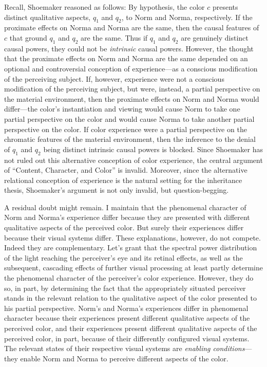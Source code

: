 \documentclass[12pt]{article}
\begin{document}
Recall, Shoemaker reasoned as follows: By hypothesis, the color \(c\) presents distinct qualitative aspects, \(q_1\) and \(q_2\), to Norm and Norma, respectively. If the proximate effects on Norma and Norma are the same, then the causal features of \(c\) that ground \(q_1\) and \(q_2\) are the same. Thus if \(q_1\) and \(q_2\) are genuinely distinct causal powers, they could not be \emph{intrinsic} causal powers. However, the thought that the proximate effects on Norm and Norma are the same depended on an optional and controversial conception of experience---as a conscious modification of the perceiving subject. If, however, experience were not a conscious modification of the perceiving subject, but were, instead, a partial perspective on the material environment, then the proximate effects on Norm and Norma would differ---the color's instantiation and viewing would cause Norm to take one partial perspective on the color and would cause Norma to take another partial perspective on the color. If color experience were a partial perspective on the chromatic features of the material environment, then the inference to the denial of \(q_1\) and \(q_2\) being distinct intrinsic causal powers is blocked. Since Shoemaker has not ruled out this alternative conception of color experience, the central argument of ``Content, Character, and Color'' is invalid. Moreover, since the alternative relational conception of experience is the natural setting for the inheritance thesis, Shoemaker's argument is not only invalid, but question-begging.

A residual doubt might remain. I maintain that the phenomenal character of Norm and Norma's experience differ because they are presented with different qualitative aspects of the perceived color. But surely their experiences differ because their visual systems differ. These explanations, however, do not compete. Indeed they are complementary. Let's grant that the spectral power distribution of the light reaching the perceiver's eye and its retinal effects, as well as the subsequent, cascading effects of further visual processing at least partly determine the phenomenal character of the perceiver's color experience. However, they do so, in part, by determining the fact that the appropriately situated perceiver stands in the relevant relation to the qualitative aspect of the color presented to his partial perspective. Norm's and Norma's experiences differ in phenomenal character because their experiences present different qualitative aspects of the perceived color, and their experiences present different qualitative aspects of the perceived color, in part, because of their differently configured visual systems. The relevant states of their respective visual systems are \emph{enabling conditions}---they enable Norm and Norma to perceive different aspects of the color. \citep[Though see][who rejects this thought without comment though his entire case against disjunctivism depends upon it.]{Burge:2005uq}
\end{document}
